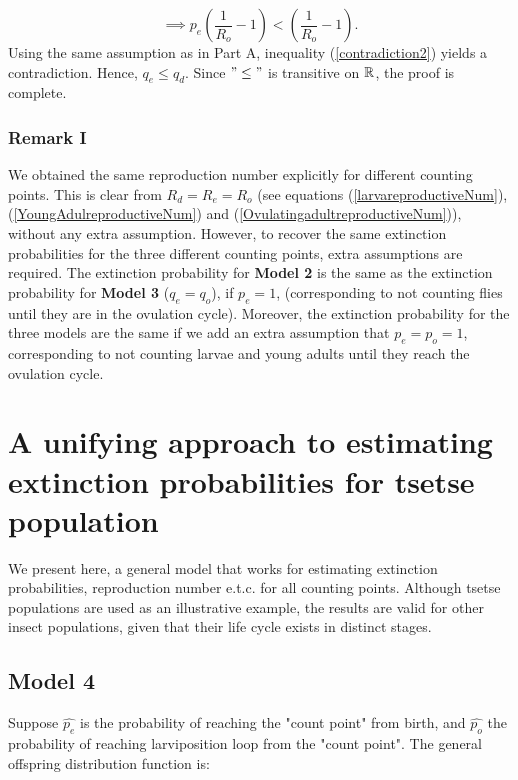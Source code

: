 \documentclass[smallextended]{svjour3}
\begin{document}
\begin{equation}
\label{contradiction2}
\implies  p_{e}(\frac{1}{R_{o}} - 1) <     (\frac{1}{R_{o}} - 1).
\end{equation}
Using the same assumption as in Part A, inequality (\ref{contradiction2}) yields a contradiction. Hence, $q_{e} \leq q_{d}$. Since $"\leq"$ is transitive on ${\Bbb R}$, the proof is complete.

\subsubsection*{\bf Remark I}
We obtained the same reproduction number explicitly for different counting points. This is clear from  $R_{d} = R_{e}=R_{o}$ (see equations (\ref{larvareproductiveNum}), (\ref{YoungAdulreproductiveNum}) and (\ref{OvulatingadultreproductiveNum})), without any extra assumption. However, to recover the same extinction probabilities for the three different counting points, extra assumptions are required. The extinction probability for {\bf Model 2} is the same as the extinction probability for {\bf Model 3} ($q_{e} =q_{o}$), if $p_{e} = 1$, (corresponding to not counting flies until they are in the ovulation cycle). Moreover, the extinction probability for the three models are the same if we add an extra assumption that $p_{e} =p_{o} = 1$, corresponding to not counting larvae and young adults until they reach the ovulation cycle. \\


\section{\bf A unifying approach to estimating extinction probabilities for tsetse population}

We present here, a general model that works for estimating extinction probabilities, reproduction number e.t.c.   for all counting points. Although tsetse populations are used as an illustrative example, the results are valid for other insect populations, given that their life cycle exists in distinct stages. 


\subsection{\bf Model 4}
Suppose $\hat{p_e}$ is the probability of reaching the "count point" from birth, and $\hat{p_o}$ the
probability of reaching larviposition loop from the "count point". The general offspring distribution function is: 
\end{document}
